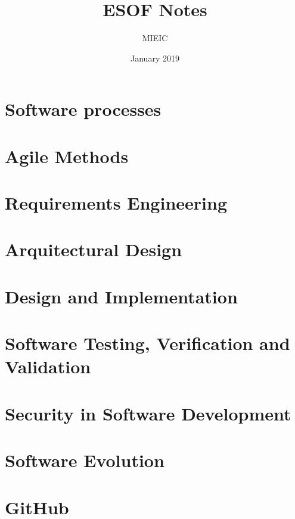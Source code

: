\documentclass{article}
\title{ESOF Notes}
\author{MIEIC}
\date{January 2019}
\begin{document}
\maketitle

\tableofcontents

\section{Software processes}



\section{Agile Methods}



\section{Requirements Engineering}



\section{Arquitectural Design}



\section{Design and Implementation}



\section{Software Testing, Verification and Validation}



\section{Security in Software Development}



\section{Software Evolution}



\section{GitHub}


\end{document}
